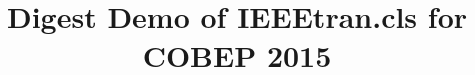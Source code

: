 \documentclass[a4paper,oneside,onecolumn,draftcls,12pt,conference]{IEEEtran}
\begin{document}
%
\title{Digest Demo of IEEEtran.cls \cite{IEEEhowto:IEEEtranpage} for COBEP 2015}




% 
\end{document}
